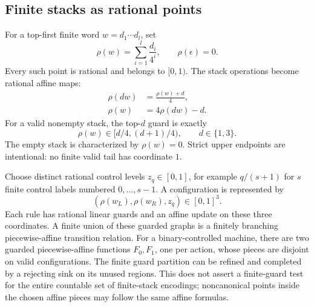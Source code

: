 \documentclass[11pt,letterpaper]{article}
\theoremstyle{definition}
\theoremstyle{remark}
\newcommand{\1}{\mathbf 1}
\begin{document}
\subsection{Finite stacks as rational points}
For a top-first finite word $w=d_1\cdots d_l$, set
\begin{equation}\label{lbh:eq:rational-stack}
 \rho(w)=\sum_{i=1}^{l}\frac{d_i}{4^i},\qquad\rho(\epsilon)=0.
\end{equation}
Every such point is rational and belongs to $[0,1)$. The stack operations
become rational affine maps:
\begin{align}
 \rho(dw)&=\frac{\rho(w)+d}{4},\label{lbh:eq:affine-push}\\
 \rho(w)&=4\rho(dw)-d.\label{lbh:eq:affine-pop}
\end{align}
For a valid nonempty stack, the top-$d$ guard is exactly
\begin{equation}\label{lbh:eq:affine-top}
 \rho(w)\in[d/4,(d+1)/4),\qquad d\in\{1,3\}.
\end{equation}
The empty stack is characterized by $\rho(w)=0$. Strict upper endpoints
are intentional: no finite valid tail has coordinate $1$.

Choose distinct rational control levels $z_q\in[0,1]$, for example
$q/(s+1)$ for $s$ finite control labels numbered $0,\ldots,s-1$.
A configuration is represented by
\begin{equation}\label{lbh:eq:geometric-config}
 (\rho(w_L),\rho(w_R),z_q)\in[0,1]^3.
\end{equation}
Each rule has rational linear guards and an affine update on these three
coordinates. A finite union of these guarded graphs is a finitely branching
piecewise-affine transition relation. For a binary-controlled machine,
there are two guarded piecewise-affine functions $F_0,F_1$, one per action,
whose pieces are disjoint on valid configurations. The finite guard partition can be refined and completed by a rejecting
sink on its unused regions. This does not assert a finite-guard test for
the entire countable set of finite-stack encodings; noncanonical points
inside the chosen affine pieces may follow the same affine formulas.
\end{document}

